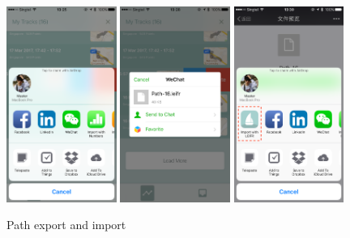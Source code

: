 \documentclass[12pt,a4paper]{article}
\begin{document}
            \begin{figure}
                \includegraphics[width=0.32\textwidth]{4-1-5-d}
                \includegraphics[width=0.32\textwidth]{4-1-5-e}
                \includegraphics[width=0.32\textwidth]{4-1-5-f}
                \centering
                \caption{Path export and import}
                \label{fig:path-share}
            \end{figure}
            
\end{document}
